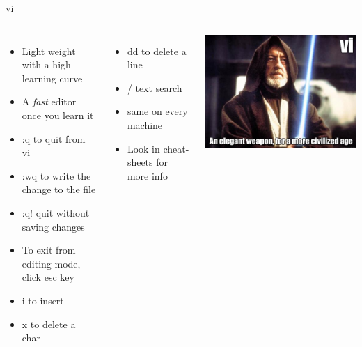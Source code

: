 \documentclass{beamer}
\begin{document}
\begin{frame}{vi}
\begin{columns}
\begin{itemize}
\item Light weight with a high learning curve
\item A \textit{fast} editor once you learn it
\item :q to quit from vi
\item :wq  to write the change to the file
\item :q! quit without saving changes
\item To exit from editing mode, click esc key
\item i to insert
\item x to delete a char
\end{itemize}
\begin{itemize}
\item dd to delete a line
\item / text search
\item same on every machine
\item Look in cheat-sheets for more info
\end{itemize}
\includegraphics[width=1.0\textwidth]{../imgs/meme-5393808378298368.png}
\end{columns}
\end{frame}
\end{document}
